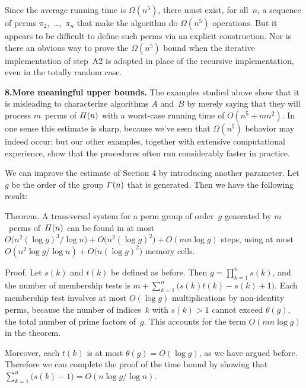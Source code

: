 Since the average running time is $\Omega(n^5)$, there must exist,
for all~$n$, a sequence of perms $\pi_2$,~\dots,~$\pi_n$ that make the
algorithm do $\Omega(n^5)$ operations. But it appears to be difficult to
define such perms via an explicit construction.
Nor is there an obvious way to prove the $\Omega(n^5)$ bound when the
iterative implementation of step~A2 is adopted in place of the
recursive implementation, even in the totally random case.

\medskip
\noindent
{\bf 8.\enspace More meaningful upper bounds.}\enspace
The examples studied above show that it
is misleading to characterize algorithms $A$ and~$B$ by merely saying that
they will process $m$~perms of ${\mit\Pi}(n)$ with a
 worst-case running time of $O(n^5+mn^2)$.
In one sense this estimate is sharp, because we've seen that
$\Omega(n^5)$ behavior may indeed occur; but our other examples, together
with extensive computational experience, show that the procedures often
run considerably faster in practice.

We can improve the estimate of Section 4 by introducing another
parameter. Let $g$ be the order of the group ${\mit\Gamma}(n)$ that is generated.
Then we have the following result:

\proclaim Theorem. A transversal system for a perm group of order~$g$
generated by $m$~perms of~${\mit\Pi}(n)$ can be found in at most\/
$O\bigl(n^2(\log g)^3/\!\log n\bigr)+O\bigl(n^2(\log g)^2\bigr)
+O(mn\log g)$ steps, using at most $O(n^2\log g/\!\log
n)+O\bigl(n(\log g)^2\bigr)$ memory cells.

\noindent Proof. Let $s(k)$ and $t(k)$ be defined as before. Then
$g=\prod_{k=1}^n s(k)$, and the number of membership tests is $m+
\sum_{k=1}^n\bigl(s(k)t(k)-s(k)+1\bigr)$. Each membership test involves
at most $O(\log g)$ multiplications by non-identity perms, because the
number of indices~$k$ with $s(k)>1$ cannot exceed $\theta(g)$, the
total number of prime factors of~$g$. This accounts for the term
$O(mn\log g)$ in the theorem.

Moreover, each $t(k)$ is at most $\theta(g)=O(\log g)$, as we have
argued before. Therefore we can complete the proof of the time bound
by showing that
$\sum_{k=1}^n\bigl(s(k)-1\bigr)=O(n\log g/\!\log n)$.

